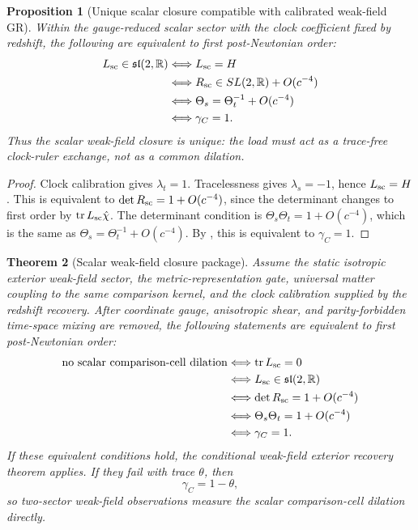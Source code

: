 \documentclass[11pt]{article}
\newtheorem{theorem}{Theorem}[section]
\newtheorem{proposition}[theorem]{Proposition}
\theoremstyle{remark}
\begin{document}
\begin{proposition}[Unique scalar closure compatible with calibrated weak-field GR]
\label{prop:unique-scalar-closure}
Within the gauge-reduced scalar sector with the clock coefficient fixed by redshift, the following are equivalent to first post-Newtonian order:
\[
\begin{aligned}
        L_{\rm sc}\in\mathfrak{sl}(2,\mathbb R)
        &\Longleftrightarrow
        L_{\rm sc}=H \\
        &\Longleftrightarrow
        R_{\rm sc}\in SL(2,\mathbb R)+O(c^{-4}) \\
        &\Longleftrightarrow
        \Theta_s=\Theta_t^{-1}+O(c^{-4}) \\
        &\Longleftrightarrow
        \gamma_C=1.
\end{aligned}
\]
Thus the scalar weak-field closure is unique: the load must act as a trace-free clock-ruler exchange, not as a common dilation.
\end{proposition}

\begin{proof}
Clock calibration gives \(\lambda_t=1\).  Tracelessness gives \(\lambda_s=-1\), hence \(L_{\rm sc}=H\).  This is equivalent to \(\det R_{\rm sc}=1+O(c^{-4})\), since the determinant changes to first order by \(\operatorname{tr}L_{\rm sc}\hat\chi\).  The determinant condition is \(\Theta_s\Theta_t=1+O(c^{-4})\), which is the same as \(\Theta_s=\Theta_t^{-1}+O(c^{-4})\).  By , this is equivalent to \(\gamma_C=1\).
\end{proof}

\begin{theorem}[Scalar weak-field closure package]
\label{thm:scalar-closure-package}
Assume the static isotropic exterior weak-field sector, the metric-representation gate, universal matter coupling to the same comparison kernel, and the clock calibration supplied by the redshift recovery.  After coordinate gauge, anisotropic shear, and parity-forbidden time-space mixing are removed, the following statements are equivalent to first post-Newtonian order:
\[
\begin{aligned}
        \text{no scalar comparison-cell dilation}
        &\Longleftrightarrow
        \operatorname{tr}L_{\rm sc}=0 \\
        &\Longleftrightarrow
        L_{\rm sc}\in\mathfrak{sl}(2,\mathbb R) \\
        &\Longleftrightarrow
        \det R_{\rm sc}=1+O(c^{-4}) \\
        &\Longleftrightarrow
        \Theta_s\Theta_t=1+O(c^{-4}) \\
        &\Longleftrightarrow
        \gamma_C=1.
\end{aligned}
\]
If these equivalent conditions hold, the conditional weak-field exterior recovery theorem applies.  If they fail with trace \(\theta\), then
\[
        \gamma_C=1-\theta,
\]
so two-sector weak-field observations measure the scalar comparison-cell dilation directly.
\end{theorem}
\end{document}
